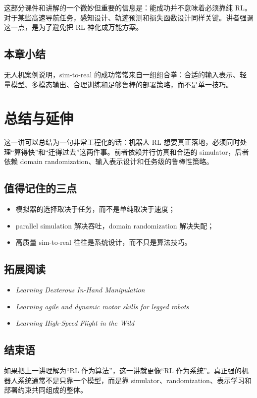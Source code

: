 \documentclass[a4paper]{article}
\begin{document}
这部分课件和讲解的一个微妙但重要的信息是：能成功并不意味着必须靠纯 RL。对于某些高速导航任务，感知设计、轨迹预测和损失函数设计同样关键。讲者强调这一点，是为了避免把 RL 神化成万能方案。

\subsection{本章小结}

无人机案例说明，sim-to-real 的成功常常来自一组组合拳：合适的输入表示、轻量模型、多模态输出、合理训练和足够鲁棒的部署策略，而不是单一技巧。

\section{总结与延伸}

这一讲可以总结为一句非常工程化的话：机器人 RL 想要真正落地，必须同时处理“算得快”和“迁得过去”这两件事。前者依赖并行仿真和合适的 simulator，后者依赖 domain randomization、输入表示设计和任务级的鲁棒性策略。

\subsection{值得记住的三点}

\begin{itemize}
  \item 模拟器的选择取决于任务，而不是单纯取决于速度；
  \item parallel simulation 解决吞吐，domain randomization 解决失配；
  \item 高质量 sim-to-real 往往是系统设计，而不只是算法技巧。
\end{itemize}

\subsection{拓展阅读}

\begin{itemize}
  \item \emph{Learning Dexterous In-Hand Manipulation}
  \item \emph{Learning agile and dynamic motor skills for legged robots}
  \item \emph{Learning High-Speed Flight in the Wild}
\end{itemize}

\subsection{结束语}

如果把上一讲理解为“RL 作为算法”，这一讲就更像“RL 作为系统”。真正强的机器人系统通常不是只靠一个模型，而是靠 simulator、randomization、表示学习和部署约束共同组成的整体。
\end{document}
